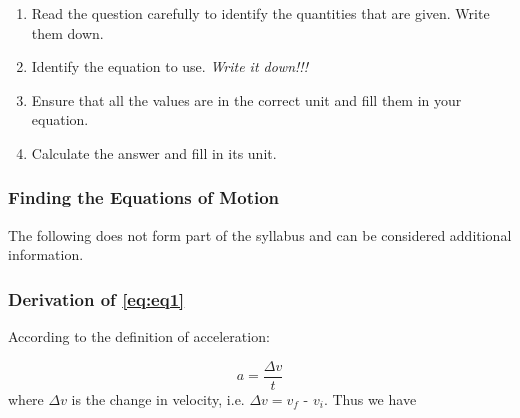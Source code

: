       \label{m38796*id76133}\begin{enumerate}[noitemsep, label=\textbf{\arabic*}. ] 
            \label{m38796*uid130}\item Read the question carefully to identify the quantities that are given. Write them down.
\label{m38796*uid131}\item Identify the equation to use. \textsl{Write it down!!!}\label{m38796*uid132}\item Ensure that all the values are in the correct unit and fill them in your equation.
\label{m38796*uid133}\item Calculate the answer and fill in its unit.
\end{enumerate}
	\par
      \label{m38796*uid134}
            \subsubsection{Finding the Equations of Motion}
            \nopagebreak
        \label{m38796*id76225}The following does not form part of the syllabus and can be considered additional information.\par 
        \label{m38796*uid135}
            \subsubsection{ Derivation of \ref{eq:eq1}}
            \nopagebreak
          \label{m38796*id76242}According to the definition of acceleration:\par 
          \label{m38796*id76246}\nopagebreak\noindent{}
            
    \begin{equation}
    a=\frac{\Delta v}{t}
      \end{equation}
          \label{m38796*id76270}where $\Delta v$ is the change in velocity, i.e. $\Delta v={v}_{f}$ - ${v}_{i}$.
Thus we have\par 
          \label{m38796*id76324}\nopagebreak\noindent{}
            
